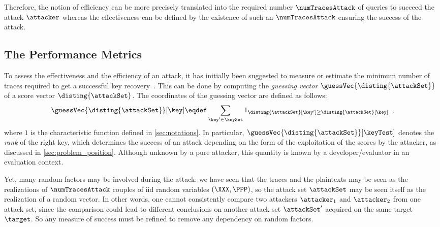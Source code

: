 Therefore, the notion of efficiency can be more precisely translated into the required number \(\numTracesAttack\) of queries to succeed the attack \(\attacker\) whereas the effectiveness can be defined by the existence of such an \(\numTracesAttack\) ensuring the success of the attack.

\subsection{The Performance Metrics}
\label{sec:performance_metrics}
To assess the effectiveness and the efficiency of an attack, it has initially been suggested to measure or estimate the minimum number of traces required to get a successful key recovery~\cite{mangard_power_2007}.
This can be done by computing the \emph{guessing vector} \(\guessVec{\disting{\attackSet}}\) of a score vector \(\disting{\attackSet}\).
The coordinates of the guessing vector are defined as follows:
\begin{equation}
	\guessVec{\disting{\attackSet}}[\key] \eqdef \sum_{\key' \in \keySet}
	1_{\disting{\attackSet}[\key'] \geq \disting{\attackSet}[\key]} \enspace ,
	\label{eq:guess_vec}
\end{equation}
where \(1\) is the characteristic function defined in \autoref{sec:notations}.
In particular, \(\guessVec{\disting{\attackSet}}[\keyTest]\) denotes the \emph{rank} of the right key, which determines the success of an attack depending on the form of the exploitation of the scores by the attacker, as discussed in \autoref{sec:problem_position}.
Although unknown by a pure attacker, this quantity is known by a developer/evaluator in an evaluation context.

Yet, many random factors may be involved during the attack: we have seen that the traces and the plaintexts may be seen as the realizations of \(\numTracesAttack\) couples of \gls{iid} random variables \((\XXX, \PPP)\), so the attack set \(\attackSet\) may be seen itself as the realization of a random vector.
In other words, one cannot consistently compare two attackers \(\attacker_1\) and \(\attacker_2\) from one attack set, since the comparison could lead to different conclusions on another attack set \(\attackSet'\) acquired on the same target \(\target\).
So any measure of success must be refined to remove any dependency on random factors.

